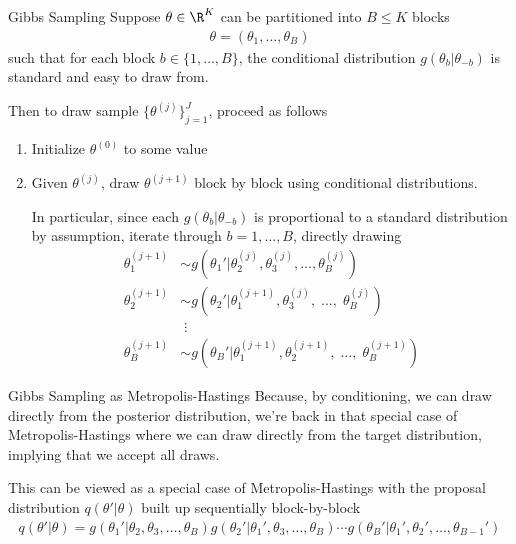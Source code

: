 \documentclass[aspectratio=169, handout]{beamer}
\begin{document}
{\footnotesize
\begin{frame}{Gibbs Sampling}
Suppose $\theta\in\R^K$ can be partitioned into $B\leq K$
blocks
\begin{align*}
  \theta=(\theta_1,\ldots,\theta_B)
\end{align*}
such that for each block $b\in\{1,\ldots,B\}$, the \alert{conditional}
distribution $g(\theta_b|\theta_{-b})$ is standard and easy to draw
from.

Then to draw sample $\{\theta^{(j)}\}_{j=1}^J$,
proceed as follows
\vspace{-10pt}
\begin{enumerate}
  \item Initialize $\theta^{(0)}$ to some value
  \item Given $\theta^{(j)}$, draw $\theta^{(j+1)}$
    block by block using conditional distributions.

    In particular, since each $g(\theta_b|\theta_{-b})$ is proportional
    to a standard distribution by assumption, iterate through
    $b=1,\ldots,B$, directly drawing
    \begin{align*}
      \theta_1^{(j+1)}
      &\sim g(\theta_{1}'|\theta^{(j)}_{2},\theta^{(j)}_{3},\ldots,\theta^{(j)}_{B})
      \\
      \theta_2^{(j+1)}
      &\sim
      g(\theta_2'|\theta^{(j+1)}_{1},\theta^{(j)}_{3},\;\ldots,\;\theta^{(j)}_{B})
      \\
      &\;\vdots
      \\
      \theta_B^{(j+1)}
      &\sim
      g(\theta_B'|\theta^{(j+1)}_{1},\theta^{(j+1)}_{2},\;\ldots,\;\theta^{(j+1)}_B)
    \end{align*}
\end{enumerate}
\end{frame}
}

{\footnotesize
\begin{frame}{Gibbs Sampling as Metropolis-Hastings}
Because, by conditioning, we can draw directly from the posterior
distribution, we're back in that special case of Metropolis-Hastings
where we can draw \alert{directly} from the target distribution,
implying that we accept all draws.

This can be viewed as a special case of Metropolis-Hastings with the
proposal distribution $q(\theta'|\theta)$ built up
sequentially block-by-block
\begin{align*}
  q(\theta'|\theta)
  =
  g(\theta_1'|\theta_2,\theta_3,\ldots,\theta_B)
  g(\theta_2'|\theta_1',\theta_3,\ldots,\theta_B)
  \cdots
  g(\theta_B'|\theta_1',\theta_2',\ldots,\theta_{B-1}')
\end{align*}
\end{frame}
}
\end{document}
